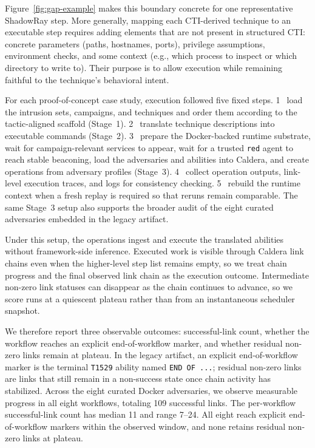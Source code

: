 \documentclass[sigconf]{acmart}
\newcommand{\caldera}{Caldera\xspace}
\newcommand{\stepone}{\textcircled{\scriptsize 1}}
\newcommand{\steptwo}{\textcircled{\scriptsize 2}}
\newcommand{\stepthree}{\textcircled{\scriptsize 3}}
\newcommand{\stepfour}{\textcircled{\scriptsize 4}}
\newcommand{\stepfive}{\textcircled{\scriptsize 5}}
\begin{document}
Figure~\ref{fig:gap-example} makes this boundary concrete for one representative ShadowRay step. More generally, mapping each CTI-derived technique to an executable step requires adding elements that are not present in structured CTI: concrete parameters (paths, hostnames, ports), privilege assumptions, environment checks, and some context (e.g., which process to inspect or which directory to write to). Their purpose is to allow execution while remaining faithful to the technique's behavioral intent.

For each proof-of-concept case study, execution followed five fixed steps. \stepone\ load the intrusion sets, campaigns, and techniques and order them according to the tactic-aligned scaffold (Stage~1). \steptwo\ translate technique descriptions into executable commands (Stage~2). \stepthree\ prepare the Docker-backed runtime substrate, wait for campaign-relevant services to appear, wait for a trusted \texttt{red} agent to reach stable beaconing, load the adversaries and abilities into \caldera{}, and create operations from adversary profiles (Stage~3). \stepfour\ collect operation outputs, link-level execution traces, and logs for consistency checking. \stepfive\ rebuild the runtime context when a fresh replay is required so that reruns remain comparable. The same Stage~3 setup also supports the broader audit of the eight curated adversaries embedded in the legacy artifact.

Under this setup, the operations ingest and execute the translated abilities without framework-side inference. Executed work is visible through \caldera{} link chains even when the higher-level step list remains empty, so we treat chain progress and the final observed link chain as the execution outcome. Intermediate non-zero link statuses can disappear as the chain continues to advance, so we score runs at a quiescent plateau rather than from an instantaneous scheduler snapshot.

We therefore report three observable outcomes: successful-link count, whether the workflow reaches an explicit end-of-workflow marker, and whether residual non-zero links remain at plateau. In the legacy artifact, an explicit end-of-workflow marker is the terminal \texttt{T1529} ability named \texttt{END OF ...}; residual non-zero links are links that still remain in a non-success state once chain activity has stabilized. Across the eight curated Docker adversaries, we observe measurable progress in all eight workflows, totaling 109 successful links. The per-workflow successful-link count has median 11 and range 7--24. All eight reach explicit end-of-workflow markers within the observed window, and none retains residual non-zero links at plateau.
\end{document}
